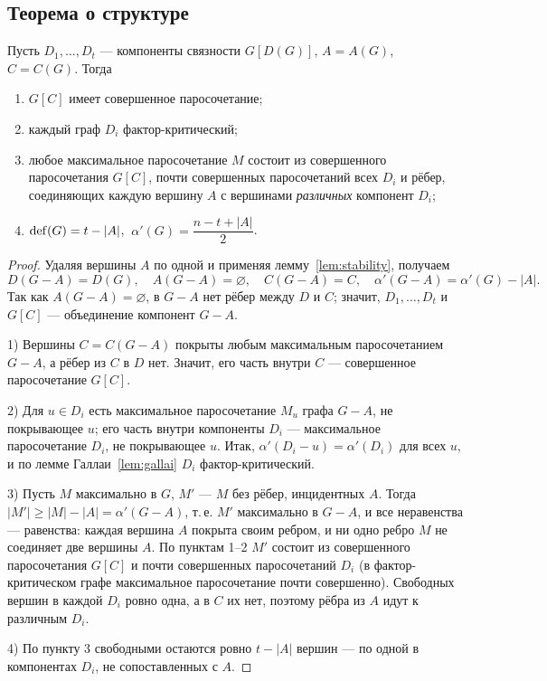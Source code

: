 \subsection*{Теорема о структуре}
\begin{theorem}
Пусть \(D_1,\ldots,D_t\) — компоненты связности \(G[D(G)]\), \(A=A(G)\), \(C=C(G)\). Тогда
\begin{enumerate}\tightlist
\item \(G[C]\) имеет совершенное паросочетание;
\item каждый граф \(D_i\) фактор-критический;
\item любое максимальное паросочетание \(M\) состоит из совершенного паросочетания
  \(G[C]\), почти совершенных паросочетаний всех \(D_i\) и рёбер, соединяющих каждую
  вершину \(A\) с вершинами \emph{различных} компонент \(D_i\);
\item \(\operatorname{def}(G)=t-|A|\), \(\ \alpha'(G)=\dfrac{n-t+|A|}{2}\).
\end{enumerate}
\end{theorem}
\begin{proof}
Удаляя вершины \(A\) по одной и применяя лемму~\ref{lem:stability}, получаем
\[
D(G-A)=D(G),\quad A(G-A)=\varnothing,\quad C(G-A)=C,\quad\alpha'(G-A)=\alpha'(G)-|A|.
\]
Так как \(A(G-A)=\varnothing\), в \(G-A\) нет рёбер между \(D\) и \(C\); значит,
\(D_1,\ldots,D_t\) и \(G[C]\) — объединение компонент \(G-A\).

1) Вершины \(C=C(G-A)\) покрыты любым максимальным паросочетанием \(G-A\), а
рёбер из \(C\) в \(D\) нет. Значит, его часть внутри \(C\) — совершенное паросочетание \(G[C]\).

2) Для \(u\in D_i\) есть максимальное паросочетание \(M_u\) графа \(G-A\), не
покрывающее \(u\); его часть внутри компоненты \(D_i\) — максимальное паросочетание
\(D_i\), не покрывающее \(u\). Итак, \(\alpha'(D_i-u)=\alpha'(D_i)\) для всех \(u\), и по
лемме Галлаи~\ref{lem:gallai} \(D_i\) фактор-критический.

3) Пусть \(M\) максимально в \(G\), \(M'\) — \(M\) без рёбер, инцидентных \(A\). Тогда
\(|M'|\ge|M|-|A|=\alpha'(G-A)\), т.\,е. \(M'\) максимально в \(G-A\), и все неравенства —
равенства: каждая вершина \(A\) покрыта своим ребром, и ни одно ребро \(M\) не
соединяет две вершины \(A\). По пунктам 1–2 \(M'\) состоит из совершенного
паросочетания \(G[C]\) и почти совершенных паросочетаний \(D_i\) (в фактор-критическом
графе максимальное паросочетание почти совершенно). Свободных вершин в каждой
\(D_i\) ровно одна, а в \(C\) их нет, поэтому рёбра из \(A\) идут к различным \(D_i\).

4) По пункту 3 свободными остаются ровно \(t-|A|\) вершин — по одной в
компонентах \(D_i\), не сопоставленных с \(A\).
\end{proof}

